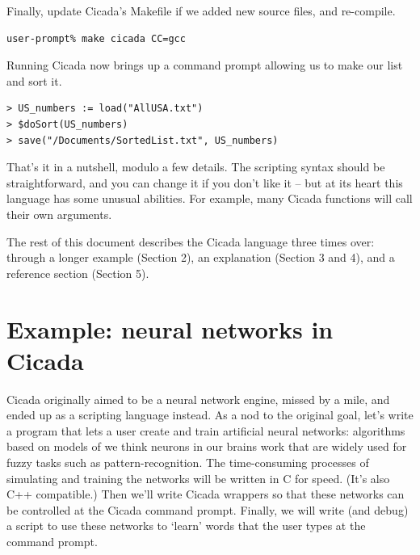 \documentclass{article}
\newenvironment{code}{
       \begin{list}{}{
               \setlength{\leftmargin}{.4in}
               \setlength{\rightmargin}{0in}
               \setlength{\topsep}{.2in}
       }
       \small
       \item[] }
       { \end{list}   }
\begin{document}
\noindent Finally, update Cicada's Makefile if we added new source files, and re-compile.

\begin{code} \begin{verbatim}
user-prompt% make cicada CC=gcc
\end{verbatim} \end{code}

\noindent Running Cicada now brings up a command prompt allowing us to make our list and sort it.

\begin{code} \begin{verbatim}
> US_numbers := load("AllUSA.txt")
> $doSort(US_numbers)
> save("/Documents/SortedList.txt", US_numbers)
\end{verbatim} \end{code}

\noindent That's it in a nutshell, modulo a few details.  The scripting syntax should be straightforward, and you can change it if you don't like it -- but at its heart this language has some unusual abilities.  For example, many Cicada functions will call their own arguments.

The rest of this document describes the Cicada language three times over:  through a longer example (Section 2), an explanation (Section 3 and 4), and a reference section (Section 5).

\newpage








\section{Example:  neural networks in Cicada}

Cicada originally aimed to be a neural network engine, missed by a mile, and ended up as a scripting language instead.  As a nod to the original goal, let's write a program that lets a user create and train artificial neural networks:  algorithms based on models of we think neurons in our brains work that are widely used for fuzzy tasks such as pattern-recognition.  The time-consuming processes of simulating and training the networks will be written in C for speed.  (It's also C++ compatible.)  Then we'll write Cicada wrappers so that these networks can be controlled at the Cicada command prompt.  Finally, we will write (and debug) a script to use these networks to `learn' words that the user types at the command prompt.
\end{document}
